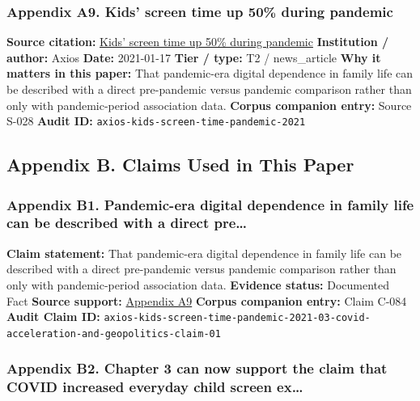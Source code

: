 \documentclass[
  american,
  11pt,
  letterpaper,
]{article}
\begin{document}
\subsubsection{Appendix A9. Kids' screen time up 50\% during
pandemic}\label{appendix-a9-kids-screen-time-up-50-during-pandemic}

\textbf{Source citation:}
\href{https://www.axios.com/2021/01/17/kids-screen-time-pandemic}{Kids'
screen time up 50\% during pandemic} \textbf{Institution / author:}
Axios \textbf{Date:} 2021-01-17 \textbf{Tier / type:} T2 / news\_article
\textbf{Why it matters in this paper:} That pandemic-era digital
dependence in family life can be described with a direct pre-pandemic
versus pandemic comparison rather than only with pandemic-period
association data. \textbf{Corpus companion entry:} Source S-028
\textbf{Audit ID:} \texttt{axios-kids-screen-time-pandemic-2021}

\subsection{Appendix B. Claims Used in This
Paper}\label{appendix-b.-claims-used-in-this-paper}

\subsubsection{Appendix B1. Pandemic-era digital dependence in family
life can be described with a direct
pre\ldots{}}\label{appendix-b1-pandemic-era-digital-dependence-in-family-life-can-be-described-with-a-direct-pre}

\textbf{Claim statement:} That pandemic-era digital dependence in family
life can be described with a direct pre-pandemic versus pandemic
comparison rather than only with pandemic-period association data.
\textbf{Evidence status:} Documented Fact \textbf{Source support:}
\hyperref[appendix-a9-kids-screen-time-up-50-during-pandemic]{Appendix
A9} \textbf{Corpus companion entry:} Claim C-084 \textbf{Audit Claim
ID:}
\texttt{axios-kids-screen-time-pandemic-2021-03-covid-acceleration-and-geopolitics-claim-01}

\subsubsection{Appendix B2. Chapter 3 can now support the claim that
COVID increased everyday child screen
ex\ldots{}}\label{appendix-b2-chapter-3-can-now-support-the-claim-that-covid-increased-everyday-child-screen-ex}
\end{document}
